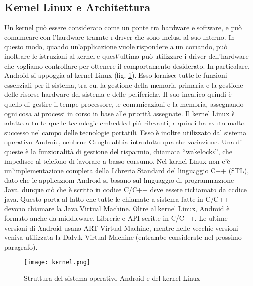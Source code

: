 \subsection{Kernel Linux e Architettura}
Un kernel può essere considerato come un ponte tra hardware e software, e può comunicare con
l’hardware tramite i driver che sono inclusi al suo interno. In questo modo, quando
un’applicazione vuole rispondere a un comando, può inoltrare le istruzioni al
kernel e quest’ultimo può utilizzare i driver dell’hardware che vogliamo
controllare per ottenere il comportamento desiderato. In particolare, Android si
appoggia al kernel Linux (fig. \ref{kernel}). Esso fornisce
tutte le funzioni essenziali per il sistema, tra cui la gestione della memoria
primaria e la gestione delle risorse hardware del sistema e delle periferiche.
Il suo incarico quindi è quello di gestire
il tempo processore, le comunicazioni e la memoria, assegnando ogni cosa ai processi in
corso in base alle priorità assegnate. Il kernel Linux è adatto a tutte quelle
tecnologie embedded più rilevanti, e quindi ha avuto molto successo nel campo
delle tecnologie portatili.
Esso è inoltre utilizzato dal sistema operativo Android, sebbene Google abbia
introdotto qualche variazione. Una di queste è la funzionalità di gestione
del risparmio, chiamata “wakelocks”, che impedisce al telefono di lavorare a
basso consumo. Nel kernel Linux non c’è un’implementazione completa della
Libreria Standard del linguaggio C++ (STL), dato che le applicazioni Android si
basano sul linguaggio di programmazione Java, dunque ciò che è scritto in codice
C/C++ deve essere richiamato da codice java. Questo porta al fatto che tutte le chiamate a
sistema fatte in C/C++ devono chiamare la Java Virtual Machine. Oltre al
kernel Linux, Android è formato anche da  middleware, Librerie e API scritte in C/C++. Le
ultime versioni di Android usano ART Virtual Machine, mentre nelle vecchie versioni
veniva utilizzata la Dalvik Virtual Machine (entrambe considerate nel prossimo
paragrafo).
\begin{figure}
    \centering
    \texttt{[image: kernel.png]}
    \caption{Struttura del sistema operativo Android e del kernel Linux}
    \label{kernel}
\end{figure}

